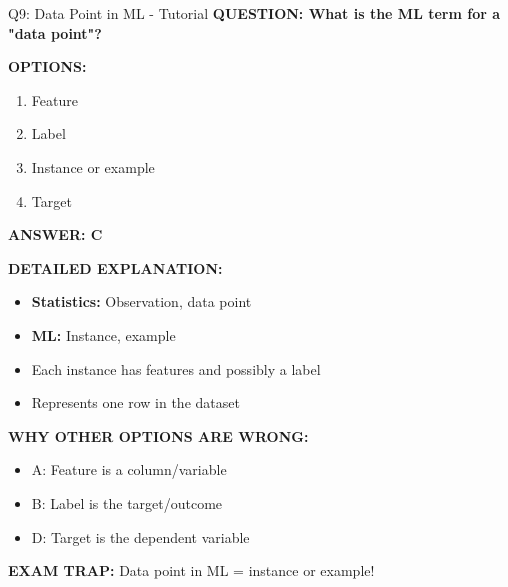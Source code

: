 \documentclass[8pt]{beamer}
\begin{document}
	\begin{frame}{Q9: Data Point in ML - Tutorial}
		\fontsize{6.5}{7.5}\selectfont
		\textbf{QUESTION: What is the ML term for a "data point"?}
		
		\vspace{0.1cm}
		\textbf{OPTIONS:}
		\begin{enumerate}
			\item Feature
			\item Label
			\item Instance or example
			\item Target
		\end{enumerate}
		
		\vspace{0.1cm}
		\textcolor{myblue}{\textbf{ANSWER: C}}
		
		\vspace{0.1cm}
		\textbf{DETAILED EXPLANATION:}
		\begin{itemize}
			\item \textbf{Statistics:} Observation, data point
			\item \textbf{ML:} Instance, example
			\item Each instance has features and possibly a label
			\item Represents one row in the dataset
		\end{itemize}
		
		\vspace{0.1cm}
		\textcolor{myred}{\textbf{WHY OTHER OPTIONS ARE WRONG:}}
		\begin{itemize}
			\item \textcolor{myred}{A:} Feature is a column/variable
			\item \textcolor{myred}{B:} Label is the target/outcome
			\item \textcolor{myred}{D:} Target is the dependent variable
		\end{itemize}
		
		\textcolor{myred}{\textbf{EXAM TRAP:}} Data point in ML = \textcolor{myblue}{instance or example}!
	\end{frame}
	
\end{document}
